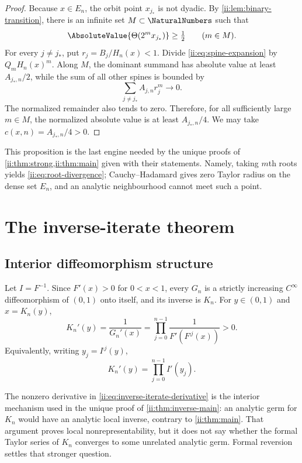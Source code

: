 \begin{proof}
Because $x\in E_n$, the orbit point $x_{j_*}$ is not dyadic.  By
\cref{ii:lem:binary-transition}, there is an infinite set $M\subset\NaturalNumbers$ such that
\begin{equation}
 \AbsoluteValue{\ThetaF(2^m x_{j_*})}\geq\half
 \qquad(m\in M).
 \label{ii:eq:dominant-theta}
\end{equation}
For every $j\neq j_*$, put $r_j=B_j/H_n(x)<1$.  Divide
\eqref{ii:eq:spine-expansion} by $Q_mH_n(x)^m$.  Along $M$, the dominant summand has
absolute value at least $A_{j_*,n}/2$, while the sum of all other spines is bounded by
\[
 \sum_{j\neq j_*}A_{j,n}r_j^m\longrightarrow0.
\]
The normalized remainder also tends to zero.  Therefore, for all sufficiently large
$m\in M$, the normalized absolute value is at least $A_{j_*,n}/4$.  We may take
$c(x,n)=A_{j_*,n}/4>0$.
\end{proof}

This proposition is the last engine needed by the unique proofs of
\cref{ii:thm:strong,ii:thm:main} given with their statements.  Namely, taking
$m$th roots yields \eqref{ii:eq:root-divergence}; Cauchy--Hadamard gives zero
Taylor radius on the dense set $E_n$, and an analytic neighbourhood cannot
meet such a point.

\section{The inverse-iterate theorem}
\label{ii:sec:inverse-transfer}

\subsection{Interior diffeomorphism structure}

Let $I=F^{-1}$.  Since $F'(x)>0$ for $0<x<1$, every $G_n$ is a strictly increasing
$C^\infty$ diffeomorphism of $(0,1)$ onto itself, and its inverse is $K_n$.  For
$y\in(0,1)$ and $x=K_n(y)$,
\begin{equation}
 K_n'(y)=\frac{1}{G_n'(x)}
 =\prod_{j=0}^{n-1}\frac{1}{F'(F^{\comp j}(x))}>0.
 \label{ii:eq:inverse-iterate-derivative}
\end{equation}
Equivalently, writing $y_j=I^{\comp j}(y)$,
\begin{equation}
 K_n'(y)=\prod_{j=0}^{n-1} I'(y_j).
 \label{ii:eq:inverse-product-slope}
\end{equation}

The nonzero derivative in \eqref{ii:eq:inverse-iterate-derivative} is the
interior mechanism used in the unique proof of \cref{ii:thm:inverse-main}:
an analytic germ for $K_n$ would have an analytic local inverse, contrary to
\cref{ii:thm:main}.  That argument proves local nonrepresentability, but it
does not say whether the formal Taylor series of $K_n$ converges to some
unrelated analytic germ.  Formal reversion settles that stronger question.

